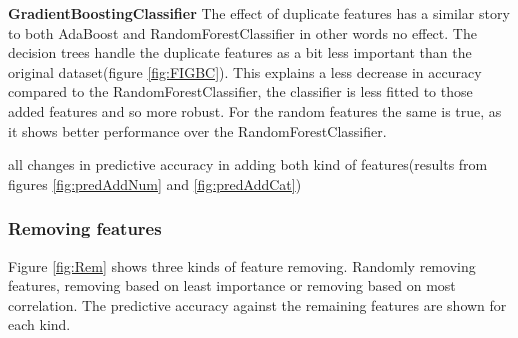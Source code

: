 \documentclass[a4paper,10pt]{article}
\begin{document}
\textbf{GradientBoostingClassifier} The effect of duplicate features has a similar story to both AdaBoost and RandomForestClassifier in other words no effect. The decision trees handle the duplicate features as a bit less important than the original dataset(figure \ref{fig:FIGBC}). This explains a less decrease in accuracy compared to the RandomForestClassifier, the classifier is less fitted to those added features and so more robust. For the random features the same is true, as it shows better performance over the RandomForestClassifier. \\

\begin{table}[h]
	\centering
	\caption{all changes in predictive accuracy in adding both kind of features(results from figures \ref{fig:predAddNum} and \ref{fig:predAddCat})}\label{table:fluc}
\end{table}
\newpage

\subsubsection{Removing features}
Figure \ref{fig:Rem} shows three kinds of feature removing. Randomly removing features, removing based on least importance or removing based on most correlation. The predictive accuracy against the remaining features are shown for each kind. 
\end{document}
